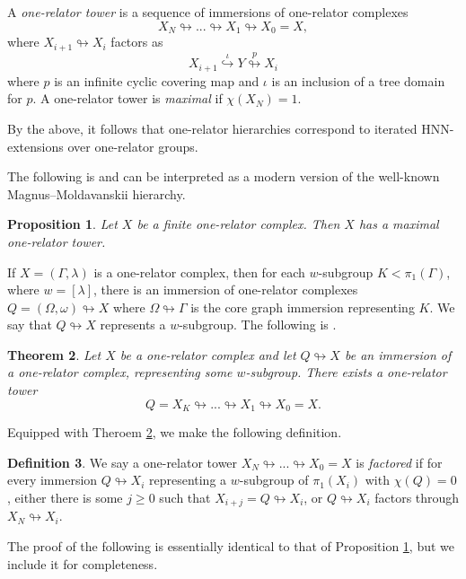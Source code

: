 \documentclass[11pt, a4paper]{amsart}
\newtheorem{theorem}{Theorem}[section]
\newtheorem{proposition}[theorem]{Proposition}
\theoremstyle{definition}
\newtheorem{definition}[theorem]{Definition}
\def\immerses{\looparrowright}
\def\injects{\hookrightarrow}
\begin{document}
A \emph{one-relator tower} is a sequence of immersions of one-relator complexes 
\[
X_N\immerses ...\immerses X_1\immerses X_0 = X, 
\]
where $X_{i+1}\immerses X_i$ factors as 
\[
X_{i+1}\overset{\iota}{\injects} Y\overset{p}{\immerses} X_i
\]
where $p$ is an infinite cyclic covering map and $\iota$ is an inclusion of a tree domain for $p$. A one-relator tower is \emph{maximal} if $\chi(X_N) = 1$.

By the above, it follows that one-relator hierarchies correspond to iterated HNN-extensions over one-relator groups.

The following is \cite[Proposition 5.1]{me_22} and can be interpreted as a modern version of the well-known Magnus--Moldavanskii hierarchy.

\begin{proposition}
\label{maximal_tower}
Let $X$ be a finite one-relator complex. Then $X$ has a maximal one-relator tower.
\end{proposition}

If $X = (\Gamma, \lambda)$ is a one-relator complex, then for each $w$-subgroup $K<\pi_1(\Gamma)$, where $w = [\lambda]$, there is an immersion of one-relator complexes $Q = (\Omega, \omega)\immerses X$ where $\Omega\immerses \Gamma$ is the core graph immersion representing $K$. We say that $Q\immerses X$ represents a $w$-subgroup. The following is \cite[Theorem 5.15]{me_22}.

\begin{theorem}
\label{relative_hierarchy}
Let $X$ be a one-relator complex and let $Q\immerses X$ be an immersion of a one-relator complex, representing some $w$-subgroup. There exists a one-relator tower
\[
Q = X_K\immerses...\immerses X_1\immerses X_0 = X.
\]
\end{theorem}

Equipped with Theroem \ref{relative_hierarchy}, we make the following definition.

\begin{definition}
We say a one-relator tower $X_N\immerses...\immerses X_0 = X$ is \emph{factored} if for every immersion $Q\immerses X_i$ representing a $w$-subgroup of $\pi_1(X_i)$ with $\chi(Q) = 0$, either there is some $j\geq 0$ such that $X_{i+j} = Q\immerses X_i$, or $Q\immerses X_i$ factors through $X_N\immerses X_i$.
\end{definition}

The proof of the following is essentially identical to that of Proposition \ref{maximal_tower}, but we include it for completeness.
\end{document}

